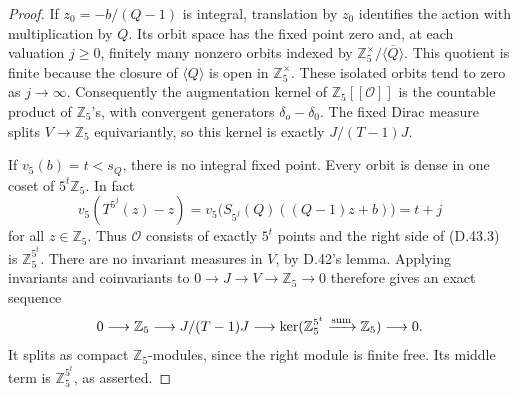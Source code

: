 \begin{proof}
If \(z_0=-b/(Q-1)\) is integral, translation
by \(z_0\) identifies the action with
multiplication by \(Q\). Its orbit space
has the fixed point zero and, at each
valuation \(j\ge0\), finitely many nonzero
orbits indexed by
\(\mathbb Z_5^\times/\overline{\langle Q\rangle}\).
This quotient is finite because the
closure of \(\langle Q\rangle\) is open
in \(\mathbb Z_5^\times\). These isolated
orbits tend to zero as \(j\to\infty\).
Consequently the augmentation kernel of
\(\mathbb Z_5[[\mathcal O]]\) is the
countable product of \(\mathbb Z_5\)'s,
with convergent generators
\(\delta_o-\delta_0\).
The fixed Dirac measure splits
\(V\to\mathbb Z_5\) equivariantly, so
this kernel is exactly \(J/(T-1)J\).

If \(v_5(b)=t<s_Q\), there is no integral
fixed point. Every orbit is dense in one
coset of \(5^t\mathbb Z_5\). In fact
\[
 v_5(T^{5^j}(z)-z)
   =v_5\bigl(S_{5^j}(Q)((Q-1)z+b)\bigr)=t+j
\]
for all \(z\in\mathbb Z_5\).
Thus \(\mathcal O\) consists of exactly
\(5^t\) points and the right side of
(D.43.3) is \(\mathbb Z_5^{5^t}\).
There are no invariant measures in \(V\),
by D.42's lemma. Applying invariants and
coinvariants to
\(0\to J\to V\to\mathbb Z_5\to0\)
therefore gives an exact sequence
\[
 0\longrightarrow\mathbb Z_5
  \longrightarrow J/(T-1)J
  \longrightarrow
       \ker(\mathbb Z_5^{5^t}\xrightarrow{\rm sum}\mathbb Z_5)
  \longrightarrow0.
\]
It splits as compact \(\mathbb Z_5\)-modules,
since the right module is finite free.
Its middle term is \(\mathbb Z_5^{5^t}\),
as asserted.
\end{proof}

